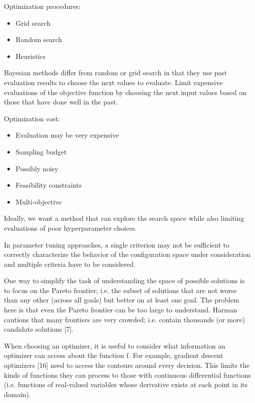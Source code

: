         Optimization procedures:
        \begin{itemize}
            \item Grid search
            \item Random search
            \item Heuristics
        \end{itemize}
        Bayesian methods differ from random or grid search in that they use past evaluation results to choose the next values to evaluate.
        Limit expensive evaluations of the objective function by choosing the next input values based on those that have done well in the past.

        Optimization cost:
        \begin{itemize}
            \item Evaluation may be very expensive
            \item Sampling budget
            \item Possibly noisy
            \item Feasibility constraints
            \item Multi-objective
        \end{itemize}
        Ideally, we want a method that can explore the search space while also limiting evaluations of poor hyperparameter choices.

        In parameter tuning approaches, a single criterion may not be sufficient to correctly characterize the behavior of the 
        configuration space under consideration and multiple criteria have to be considered.

        One way to simplify the task of understanding the space of possible solutions is to focus on the Pareto frontier; i.e. the subset 
        of solutions that are not worse than any other (across all goals) but better on at least one goal. 
        The problem here is that even the Pareto frontier can be too large to understand. Harman cautions that many frontiers are very crowded; i.e. 
        contain thousands (or more) candidate solutions [7].

        When choosing an optimizer, it is useful to consider what information an optimizer can access about the function f. For example, gradient descent optimizers [16] 
        need to access the contours around every decision. This limits the kinds of functions they can process to those with continuous differential functions (i.e. 
        functions of real-valued variables whose derivative exists at each point in its domain).

